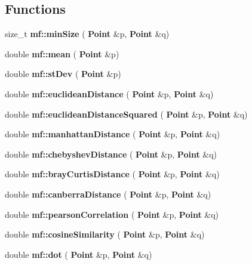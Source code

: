 \subsection*{Functions}
\begin{DoxyCompactItemize}
\item 
size\+\_\+t \textbf{ mf\+::min\+Size} (\textbf{ Point} \&p, \textbf{ Point} \&q)
\item 
double \textbf{ mf\+::mean} (\textbf{ Point} \&p)
\item 
double \textbf{ mf\+::st\+Dev} (\textbf{ Point} \&p)
\item 
double \textbf{ mf\+::euclidean\+Distance} (\textbf{ Point} \&p, \textbf{ Point} \&q)
\item 
double \textbf{ mf\+::euclidean\+Distance\+Squared} (\textbf{ Point} \&p, \textbf{ Point} \&q)
\item 
double \textbf{ mf\+::manhattan\+Distance} (\textbf{ Point} \&p, \textbf{ Point} \&q)
\item 
double \textbf{ mf\+::chebyshev\+Distance} (\textbf{ Point} \&p, \textbf{ Point} \&q)
\item 
double \textbf{ mf\+::bray\+Curtis\+Distance} (\textbf{ Point} \&p, \textbf{ Point} \&q)
\item 
double \textbf{ mf\+::canberra\+Distance} (\textbf{ Point} \&p, \textbf{ Point} \&q)
\item 
double \textbf{ mf\+::pearson\+Correlation} (\textbf{ Point} \&p, \textbf{ Point} \&q)
\item 
double \textbf{ mf\+::cosine\+Similarity} (\textbf{ Point} \&p, \textbf{ Point} \&q)
\item 
double \textbf{ mf\+::dot} (\textbf{ Point} \&p, \textbf{ Point} \&q)
\end{DoxyCompactItemize}
